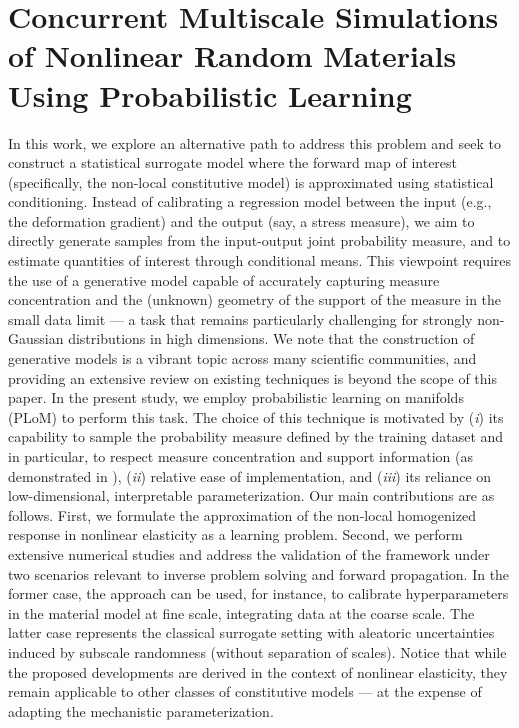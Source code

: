 \chapter{Concurrent Multiscale Simulations of Nonlinear Random Materials Using Probabilistic Learning}
\label{chap:fe2}

 In this work, we explore an alternative path to address this problem and seek to construct a statistical surrogate model where the forward map of interest (specifically, the non-local constitutive model) is approximated using statistical conditioning. Instead of calibrating a regression model between the input (e.g., the deformation gradient) and the output (say, a stress measure), we aim to directly generate samples from the input-output joint probability measure, and to estimate quantities of interest through conditional means. This viewpoint requires the use of a generative model capable of accurately capturing measure concentration and the (unknown) geometry of the support of the measure in the small data limit --- a task that remains particularly challenging for strongly non-Gaussian distributions in high dimensions. We note that the construction of generative models is a vibrant topic across many scientific communities, and providing an extensive review on existing techniques is beyond the scope of this paper. In the present study, we employ probabilistic learning on manifolds (PLoM) \cite{Soize2016,Soize2020c,Soize2022a} to perform this task. The choice of this technique is motivated by (\textit{i}) its capability to sample the probability measure defined by the training dataset and in particular, to respect measure concentration and support information (as demonstrated in \cite{Farhat2019,Ghanem2019, Arnst2021,Capiez2022,Ghanem2022, Safta2022, Sinha2023, Zhong2023, Ezvan2023, Almeida2023,Govindjee2023,Soize2024}), (\textit{ii}) relative ease of implementation, and (\textit{iii}) its reliance on low-dimensional, interpretable parameterization. Our main contributions are as follows. First, we formulate the approximation of the non-local homogenized response in nonlinear elasticity as a learning problem. Second, we perform extensive numerical studies and address the validation of the framework under two scenarios relevant to inverse problem solving and forward propagation. In the former case, the approach can be used, for instance, to calibrate hyperparameters in the material model at fine scale, integrating data at the coarse scale. The latter case represents the classical surrogate setting with aleatoric uncertainties induced by subscale randomness (without separation of scales). Notice that while the proposed developments are derived in the context of nonlinear elasticity, they remain applicable to other classes of constitutive models --- at the expense of adapting the mechanistic parameterization.

